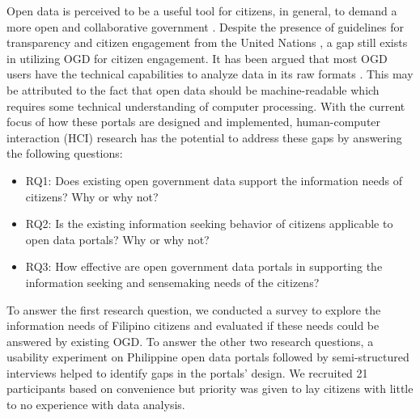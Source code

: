 \documentclass{sigchi}
\begin{document}
Open data is perceived to be a useful tool for citizens, in general, to demand a more open and collaborative government \cite{warwick2017}. Despite the presence of guidelines for transparency and citizen engagement from the United Nations \cite{UN2013}, a gap still exists in utilizing OGD for citizen engagement. It has been argued that most OGD users have the technical capabilities to analyze data in its raw formats \cite{DAWES201615}. This may be attributed to the fact that open data should be machine-readable which requires some technical understanding of computer processing. With the current focus of how these portals are designed and implemented, human-computer interaction (HCI) research has the potential to address these gaps by answering the following questions:
\begin{itemize}
  \item RQ1: Does existing open government data support the information needs of citizens? Why or why not?
  \item RQ2: Is the existing information seeking behavior of citizens applicable to open data portals? Why or why not?
  \item RQ3: How effective are open government data portals in supporting the information seeking and sensemaking needs of the citizens?
\end{itemize}

To answer the first research question, we conducted a survey to explore the information needs of Filipino citizens and evaluated if these needs could be answered by existing OGD. To answer the other two research questions, a usability experiment on Philippine open data portals followed by semi-structured interviews helped to identify gaps in the portals' design. We recruited 21 participants based on convenience but priority was given to lay citizens with little to no experience with data analysis.

\end{document}
